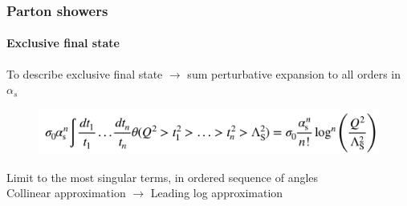 \documentclass[aspectratio=43]{beamer}
\begin{document}
\begin{frame}
	
	\frametitle{Parton showers}
	\framesubtitle{Exclusive final state}
	
	\footnotesize To describe exclusive final state $\rightarrow$ sum perturbative expansion to all orders in $\alpha_s$ \\
	
	\begin{figure}
		\includegraphics[width = 9 cm]{plots/exclusive_ll.png}
	\end{figure}
	
	\center \footnotesize Limit to the most singular terms, in ordered sequence of angles \\
	\center \color{red} Collinear approximation $\longrightarrow$ Leading log approximation

\end{frame}
\end{document}
